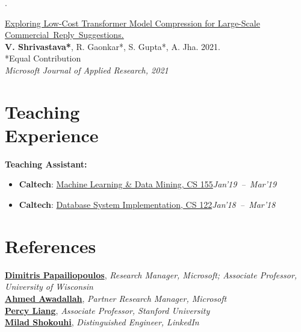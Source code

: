 \documentclass[margin,line]{templates/resume}
\renewcommand{\dates}[1]{\hfill\mbox{\small\itshape #1}}
\newcommand{\linkedpapertitle}[2]{\href{#1}{\uline{#2}}}
\newcommand{\papertitle}[2]{\linkedpapertitle{https://arxiv.org/abs/#1}{#2}}
\newcounter{publication}
\newenvironment{publication}{%
  \addtocounter{publication}{-1}%
  \noindent
  \begin{minipage}[t]{\linewidth}
  \raggedright
  \begin{list}{\ifdefined\unnumberedpublications\else\arabic{publication}.\fi}{%
    \ifdefined\unnumberedpublications
      \setlength{\leftmargin}{0pt}%
      \setlength{\labelwidth}{0pt}%
      \setlength{\labelsep}{0pt}%
    \else
      \setlength{\leftmargin}{10pt}%
      \setlength{\labelwidth}{16pt}%
      \setlength{\labelsep}{5pt}%
    \fi
    \setlength{\topsep}{0pt}%
    \setlength{\parsep}{0pt}%
  }\item\relax
}{\end{list}\end{minipage}\par\addvspace{6pt}}
\begin{document}
\begin{resume}
\begin{publication}
  \papertitle{2111.13999}{Exploring Low-Cost Transformer Model Compression for Large-Scale \mbox{Commercial Reply Suggestions.}}\\
  \textbf{V. Shrivastava*}, R. Gaonkar*, S. Gupta*, A. Jha. 2021.\\
  {*Equal Contribution}\\
  \textit{Microsoft Journal of Applied Research, 2021}
\end{publication}

\section{Teaching\\Experience}
\textsf{\textbf{Teaching Assistant:}}
\begin{itemize}[itemsep=2pt]
  \item \textbf{Caltech}: \href{http://www.yisongyue.com/courses/cs155/2019_winter/}{Machine Learning \& Data Mining, CS 155}\dates{Jan'19 -- Mar'19}
  \item \textbf{Caltech}: \href{https://catalog.caltech.edu/current/courses/department/CS}{Database System Implementation, CS 122}\dates{Jan'18 -- Mar'18}
\end{itemize}

\section{References}
\href{mailto:dimitriosp@microsoft.com}{\textsf{\textbf{Dimitris Papailiopoulos}}}, \textit{Research Manager, Microsoft; Associate Professor, University of Wisconsin}\\
\href{mailto:ahmed.awadallah@microsoft.com}{\textsf{\textbf{Ahmed Awadallah}}}, \textit{Partner Research Manager, Microsoft}\\
\href{mailto:pliang@cs.stanford.edu}{\textsf{\textbf{Percy Liang}}}, \textit{Associate Professor, Stanford University}\\
\href{mailto:shokouhi@gmail.com}{\textsf{\textbf{Milad Shokouhi}}}, \textit{Distinguished Engineer, LinkedIn}

\end{resume}
\end{document}
